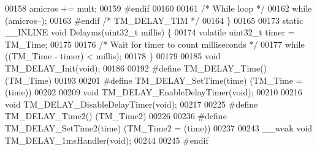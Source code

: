 \begin{DoxyCode}
00158     amicros += mult;
00159 \textcolor{preprocessor}{    #endif}
00160 
00161     \textcolor{comment}{/* While loop */}
00162     \textcolor{keywordflow}{while} (amicros--);
00163 \textcolor{preprocessor}{#endif }\textcolor{comment}{/* TM\_DELAY\_TIM */}\textcolor{preprocessor}{}
00164 \}
00165 
00173 \textcolor{keyword}{static} \_\_INLINE \textcolor{keywordtype}{void} Delayms(uint32\_t millis) \{
00174     \textcolor{keyword}{volatile} uint32\_t timer = TM\_Time;
00175 
00176     \textcolor{comment}{/* Wait for timer to count milliseconds */}
00177     \textcolor{keywordflow}{while} ((TM\_Time - timer) < millis);
00178 \}
00179 
00185 \textcolor{keywordtype}{void} TM\_DELAY\_Init(\textcolor{keywordtype}{void});
00186 
00192 \textcolor{preprocessor}{#define TM\_DELAY\_Time()                 (TM\_Time)}
00193 
00201 \textcolor{preprocessor}{#define TM\_DELAY\_SetTime(time)          (TM\_Time = (time))}
00202 
00209 \textcolor{keywordtype}{void} TM\_DELAY\_EnableDelayTimer(\textcolor{keywordtype}{void});
00210 
00216 \textcolor{keywordtype}{void} TM\_DELAY\_DisableDelayTimer(\textcolor{keywordtype}{void});
00217 
00225 \textcolor{preprocessor}{#define TM\_DELAY\_Time2()                (TM\_Time2)}
00226 
00236 \textcolor{preprocessor}{#define TM\_DELAY\_SetTime2(time)         (TM\_Time2 = (time))}
00237 
00243 \_\_weak \textcolor{keywordtype}{void} TM\_DELAY\_1msHandler(\textcolor{keywordtype}{void});
00244 
00245 \textcolor{preprocessor}{#endif}
\end{DoxyCode}
